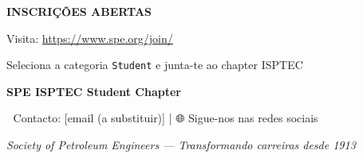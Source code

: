 \documentclass[11pt,a4paper]{article}
\begin{document}
\begin{center}
\vspace{1cm}

\begin{tcolorbox}[colback=spe-accent, colframe=spe-teal, arc=3mm, boxrule=3pt, width=17cm, inner sep=12pt]
{\color{white}\huge\bfseries INSCRIÇÕES ABERTAS}

\vspace{0.4cm}

{\color{white}\Large Visita: \url{https://www.spe.org/join/}}

\vspace{0.3cm}

{\color{white}\normalsize Seleciona a categoria \texttt{Student} e junta-te ao chapter ISPTEC}
\end{tcolorbox}

\vspace{0.8cm}

{\small\color{spe-dark}\textbf{SPE ISPTEC Student Chapter}}
\vspace{0.2cm}

{\small\color{spe-dark}📧 Contacto: [email (a substituir)] | 🌐 Sigue-nos nas redes sociais}

\vspace{0.3cm}

{\tiny\color{spe-dark}\textit{Society of Petroleum Engineers — Transformando carreiras desde 1913}}

\end{center}
\end{document}
